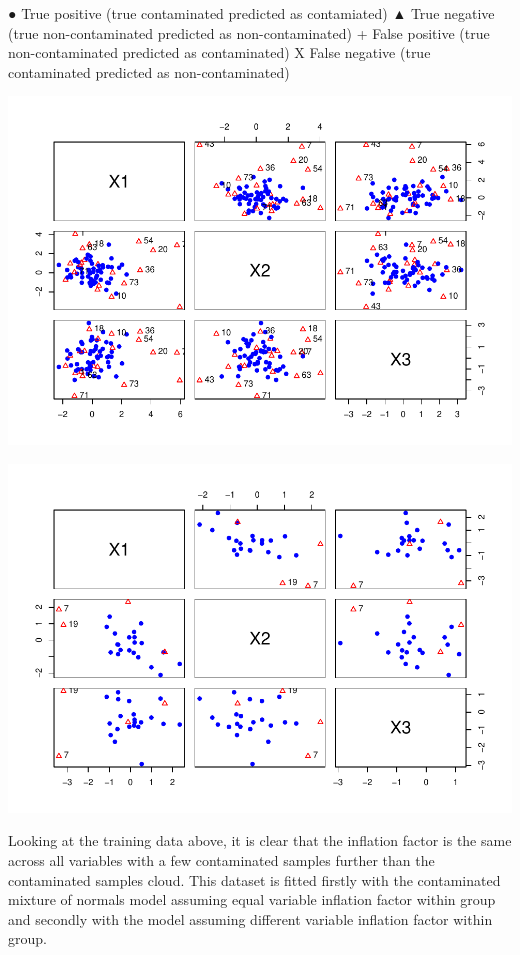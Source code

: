 \documentclass[
]{article}
\begin{document}
{●} True positive (true contaminated predicted as contamiated) {▲} True
negative (true non-contaminated predicted as non-contaminated) {+} False
positive (true non-contaminated predicted as contaminated) {X} False
negative (true contaminated predicted as non-contaminated)

\includegraphics{DifferentVarInflationFactors_files/figure-latex/plotA_training-1.pdf}

\includegraphics{DifferentVarInflationFactors_files/figure-latex/plotA_test-1.pdf}

Looking at the training data above, it is clear that the inflation
factor is the same across all variables with a few contaminated samples
further than the contaminated samples cloud. This dataset is fitted
firstly with the contaminated mixture of normals model assuming equal
variable inflation factor within group and secondly with the model
assuming different variable inflation factor within group.
\end{document}

